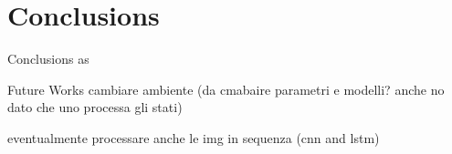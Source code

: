 \section{Conclusions}

\begin{frame}{Conclusions}
    as
\end{frame}

\begin{frame}{Future Works}
    cambiare ambiente (da cmabaire parametri e modelli? anche no dato che uno processa gli stati)
    
    eventualmente processare anche le img in sequenza (cnn and lstm)
\end{frame}